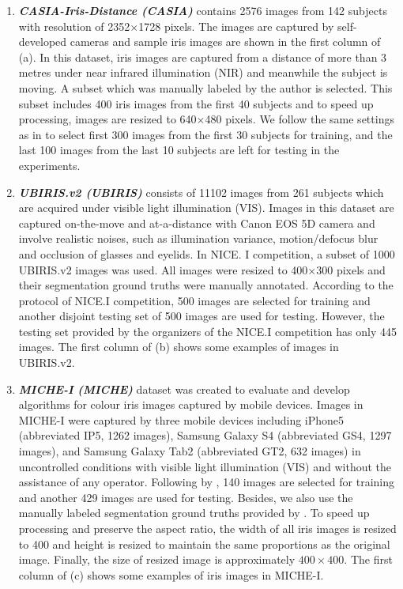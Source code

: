 \documentclass[journal]{IEEEtran}
\begin{document}
\begin{enumerate}
\item  \textbf{\emph{CASIA-Iris-Distance (CASIA)}} contains 2576 images from 142 subjects with resolution of 2352$\times$1728 pixels. The images are captured by self-developed cameras and sample iris images are shown in the first column of  (a). In this dataset, iris images are captured from a distance of more than 3 metres under near infrared illumination (NIR) and meanwhile the subject is moving. A subset which was manually labeled by the author\cite{liu2016accurate} is selected. This subset includes 400 iris images from the first 40 subjects and to speed up processing, images are resized to 640$\times$480 pixels. We follow the same settings as in \cite{liu2016accurate} to select first 300 images from the first 30 subjects for training, and the last 100 images from the last 10 subjects are left for testing in the experiments.
\item  \textbf{\emph{UBIRIS.v2 (UBIRIS)}} consists of 11102 images from 261 subjects which are acquired under visible light illumination (VIS). Images in this dataset are captured on-the-move and at-a-distance with Canon EOS 5D camera and involve realistic noises, such as illumination variance, motion/defocus blur and occlusion of glasses and eyelids. In NICE. I competition, a subset of 1000 UBIRIS.v2 images was used. All images were resized to 400$\times$300 pixels and their segmentation ground truths were manually annotated. According to the protocol of NICE.I competition, 500 images are selected for training and another disjoint testing set of 500 images are used for testing. However, the testing set provided by the organizers of the NICE.I competition has only 445 images. The first column of  (b) shows some examples of images in UBIRIS.v2.
\item  \textbf{\emph{MICHE-I (MICHE)}} dataset was created to evaluate and develop algorithms for colour iris images captured by mobile devices. Images in MICHE-I were captured by three mobile devices including iPhone5 (abbreviated IP5, 1262 images), Samsung Galaxy S4 (abbreviated GS4, 1297 images), and Samsung Galaxy Tab2 (abbreviated GT2, 632 images) in uncontrolled conditions with visible light illumination (VIS) and without the assistance of any operator\cite{Marsico2017Results}. Following by \cite{Hu2015Improving},
    140 images are selected for training and another 429 images are used for testing. Besides, we also use the manually labeled segmentation ground truths provided by \cite{Hu2015Improving}. To speed up processing and preserve the aspect ratio, the width of all iris images is resized to 400 and height is resized to maintain the same proportions as the original image. Finally, the size of resized image is approximately $400\times400$. The first column of  (c) shows some examples of iris images in MICHE-I.
\end{enumerate}
\end{document}
